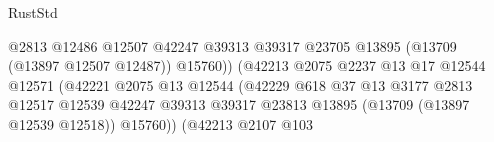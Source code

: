 \begin{lexlean}{RustStd}
\begin{coremodule}
                                                            @2813
                                                            @12486
                                                            @12507
                                                            @42247
                                                            @39313
                                                            @39317
                                                            @23705
                                                            @13895
                                                            (@13709 (@13897 @12507 @12487))
                                                            @15760))
                                                        (@42213
                                                          @2075
                                                          @2237
                                                          @13
                                                          @17
                                                          @12544
                                                          @12571
                                                          (@42221
                                                            @2075
                                                            @13
                                                            @12544
                                                            (@42229
                                                              @618
                                                              @37
                                                              @13
                                                              @3177
                                                              @2813
                                                              @12517
                                                              @12539
                                                              @42247
                                                              @39313
                                                              @39317
                                                              @23813
                                                              @13895
                                                              (@13709 (@13897 @12539 @12518))
                                                              @15760))
                                                          (@42213
                                                            @2107
                                                            @103

\end{coremodule}
\end{lexlean}
